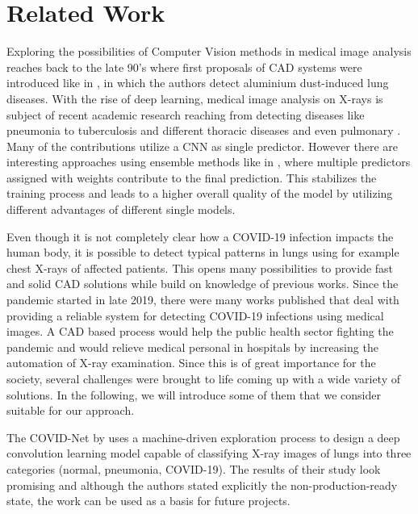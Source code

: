 \section{Related Work}
Exploring the possibilities of Computer Vision methods in medical image analysis reaches back to the late 90's where first proposals of \ac{CAD} systems were  introduced like in \autocite{kraus2000aluminium}, in which the authors detect aluminium dust-induced lung diseases.
With the rise of deep learning, medical image analysis on X-rays is subject of recent academic research reaching from detecting diseases like pneumonia \autocite{pneumoniaDetection} \autocite{pneumoniaDetection2} \autocite{gupta2019evolutionary} to tuberculosis and different thoracic diseases \autocite{jangam2021deep} and even pulmonary \autocite{vieira2021detecting}. Many of the contributions utilize a \ac{CNN} as single predictor. However there are interesting approaches using ensemble methods like in \autocite{livieris2019weighted}, where multiple predictors assigned with weights contribute to the final prediction. This stabilizes the training process and leads to a higher overall quality of the model by utilizing different advantages of different single models.

Even though it is not completely clear how a COVID-19 infection impacts the human body, it is possible to detect typical patterns in lungs using for example chest X-rays of affected patients. This opens many possibilities to provide fast and solid \ac{CAD} solutions while build on knowledge of previous works.
Since the pandemic started in late 2019, there were many works published that deal with providing a reliable system for detecting COVID-19 infections using medical images. A \ac{CAD} based process would help the public health sector fighting the pandemic and would relieve medical personal in hospitals by increasing the automation of X-ray examination. Since this is of great importance for the society, several challenges were brought to life coming up with a wide variety of solutions. In the following, we will introduce some of them that we consider suitable for our approach.

The COVID-Net \autocite{wang2020covid} by \citeauthor{wang2020covid} uses a machine-driven exploration process to design a deep convolution learning model capable of classifying X-ray images of lungs into three categories (normal, pneumonia, COVID-19). The results of their study look promising and although the authors stated explicitly the non-production-ready state, the work can be used as a basis for future projects.


